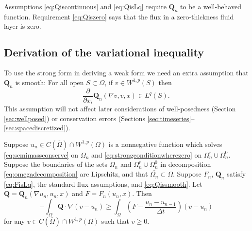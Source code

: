 \documentclass[final,leqno,onefignum,onetabnum]{siamltex1213bueler}
\newcommand\bQ{\mathbf{Q}}
\renewcommand{\grad}{\nabla}
\begin{document}
Assumptions \eqref{eq:Qiscontinuous} and \eqref{eq:QisLq} require $\bQ_n$ to be a well-behaved function.  Requirement \eqref{eq:Qiszero} says that the flux in a zero-thickness fluid layer is zero.

\subsection{Derivation of the variational inequality}  \label{subsec:derivevi}  To use the strong form in deriving a weak form we need an extra assumption that $\bQ_n$ is smooth:  For all open $S \subset \Omega$, if $v\in W^{1,p}(S)$ then
\begin{equation}
\frac{\partial}{\partial x_i} \bQ_n(\grad v,v,x) \in L^q(S). \label{eq:Qissmooth}
\end{equation}
This assumption will not affect later considerations of well-posedness (Section \ref{sec:wellposed}) or conservation errors (Sections \ref{sec:timeseries}--\ref{sec:spacediscretized}).

\begin{theorem} \label{thm:strongimpliesweak}  Suppose $u_n \in C(\overline{\Omega}) \cap W^{1,p}(\Omega)$ is a nonnegative function which solves \eqref{eq:semimassconserve} on $\Omega_n$ and \eqref{eq:strongconditionwherezero} on $\Omega_n^r \cup \Omega_n^0$.  Suppose the boundaries of the sets $\Omega_n$ and $\Omega_n^r \cup \Omega_n^0$ in decomposition \eqref{eq:omegadecomposition} are Lipschitz, and that $\overline{\Omega_n} \subset \Omega$.  Suppose $F_n$, $\bQ_n$ satisfy \eqref{eq:FisLq}, the standard flux assumptions, and \eqref{eq:Qissmooth}.  Let $\bQ = \bQ_n(\grad u_n,u_n,x)$ and $F=F_n(u_n,x)$.  Then
\begin{equation}
-\int_{\Omega} \bQ \cdot \grad(v-u_n) \ge \int_{\Omega} \left(F - \frac{u_n - u_{n-1}}{\Delta t}\right) (v-u_n) \label{eq:morallytheVI}
\end{equation}
for any $v \in C(\overline{\Omega}) \cap W^{1,p}(\Omega)$ such that $v \ge 0$.
\end{theorem}
\end{document}
